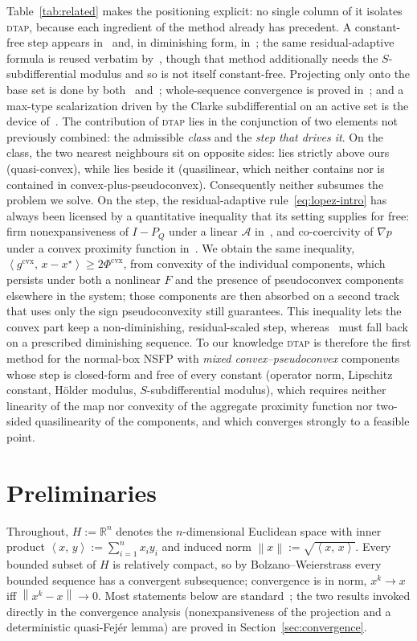 \documentclass[]{interact}
\theoremstyle{plain}
\theoremstyle{definition}
\theoremstyle{remark}
\newcommand{\R}{\mathbb{R}}
\newcommand{\norm}[1]{\left\lVert #1 \right\rVert}
\newcommand{\inner}[2]{\left\langle #1,\, #2 \right\rangle}
\newcommand{\cvx}{\mathrm{cvx}}
\newcommand{\dtap}{\textsc{dtap}}
\begin{document}
Table~\ref{tab:related} makes the positioning explicit: no single column of it isolates \dtap, because each ingredient of the method already has precedent. A constant-free step appears in~\citep{lopez2012} and, in diminishing form, in~\citep{yen2019}; the same residual-adaptive formula is reused verbatim by~\citep{chen2019ssub}, though that method additionally needs the $S$-subdifferential modulus and so is not itself constant-free. Projecting only onto the base set is done by both~\citep{hu2022quasi} and~\citep{yen2019}; whole-sequence convergence is proved in~\citep{li2013nsfp,yen2019}; and a max-type scalarization driven by the Clarke subdifferential on an active set is the device of~\citep{yen2019}. The contribution of \dtap{} lies in the conjunction of two elements not previously combined: the admissible \emph{class} and the \emph{step that drives it}. On the
class, the two nearest neighbours sit on opposite sides: \citep{hu2022quasi} lies strictly above
ours (quasi-convex), while \citep{yen2019} lies beside it (quasilinear, which neither contains nor is
contained in convex-plus-pseudoconvex). Consequently neither subsumes the problem we solve. On the step,
the residual-adaptive rule~\eqref{eq:lopez-intro} has always been licensed by a quantitative
inequality that its setting supplies for free: firm nonexpansiveness of $I-P_Q$ under a linear
$\mathcal{A}$ in~\citep{lopez2012,chen2019ssub}, and co-coercivity of $\nabla p$ under a convex
proximity function in~\citep{li2013nsfp}. We obtain the same inequality,
$\inner{g^{\cvx}}{x-x^\star}\ge2\Phi^{\cvx}$, from convexity of the individual components, which
persists under both a nonlinear $F$ and the presence of pseudoconvex components elsewhere in the system;
those components are then absorbed on a second track that uses only the sign pseudoconvexity
still guarantees. This inequality lets the convex part keep a non-diminishing, residual-scaled step, whereas~\citep{yen2019} must fall back on a prescribed diminishing sequence. To our knowledge \dtap{}
is therefore the first method for the normal-box NSFP with \emph{mixed convex--pseudoconvex}
components whose step is closed-form and free of every constant (operator norm, Lipschitz constant,
H\"older modulus, $S$-subdifferential modulus), which requires neither linearity of the map nor
convexity of the aggregate proximity function nor two-sided quasilinearity of the components, and
which converges strongly to a feasible point.

\section{Preliminaries}\label{sec:prelim}
Throughout, $H:=\R^n$ denotes the $n$-dimensional Euclidean space with inner product
$\inner{x}{y}:=\sum_{i=1}^n x_iy_i$ and induced norm $\norm{x}:=\sqrt{\inner{x}{x}}$.
Every bounded subset of $H$ is relatively compact, so by Bolzano--Weierstrass every
bounded sequence has a convergent subsequence; convergence is in norm, $x^k\to x$ iff
$\norm{x^k-x}\to 0$. Most statements below are
standard~\citep{bauschke2011,bauschkeborwein1996,mangasarian1994}; the two results
invoked directly in the convergence analysis (nonexpansiveness of the projection and
a deterministic quasi-Fej\'er lemma) are proved in Section~\ref{sec:convergence}.
\end{document}
